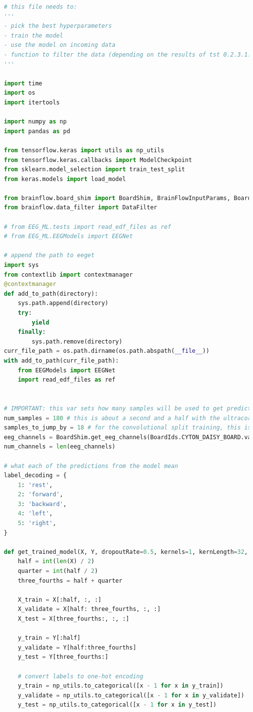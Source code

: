 \documentclass[conference]{IEEEtran}
\begin{document}
    \begin{lstlisting}[language=Python, caption=Machine Learning Calls, label=ml_calls]
# this file needs to:
'''
- pick the best hyperparameters
- train the model
- use the model on incoming data
- function to filter the data (depending on the results of tst 0.2.3.1.3 and 0.2.3.1.4)
'''

import time
import os
import itertools

import numpy as np
import pandas as pd

from tensorflow.keras import utils as np_utils
from tensorflow.keras.callbacks import ModelCheckpoint
from sklearn.model_selection import train_test_split
from keras.models import load_model

from brainflow.board_shim import BoardShim, BrainFlowInputParams, BoardIds
from brainflow.data_filter import DataFilter

# from EEG_ML.tests import read_edf_files as ref
# from EEG_ML.EEGModels import EEGNet

# append the path to eeget
import sys
from contextlib import contextmanager
@contextmanager
def add_to_path(directory):
    sys.path.append(directory)
    try:
        yield
    finally:
        sys.path.remove(directory)
curr_file_path = os.path.dirname(os.path.abspath(__file__))
with add_to_path(curr_file_path):
    from EEGModels import EEGNet
    import read_edf_files as ref


# IMPORTANT: this var sets how many samples will be used to get predictions
num_samples = 180 # this is about a second and a half with the ultracortex mark iv
samples_to_jump_by = 18 # for the convolutional split training, this is the number of samples 
eeg_channels = BoardShim.get_eeg_channels(BoardIds.CYTON_DAISY_BOARD.value)
num_channels = len(eeg_channels)

# what each of the predictions from the model mean
label_decoding = {
    1: 'rest',
    2: 'forward',
    3: 'backward',
    4: 'left',
    5: 'right',
}

def get_trained_model(X, Y, dropoutRate=0.5, kernels=1, kernLength=32, F1=8, D=2, F2=16, batch_size=16):
    half = int(len(X) / 2)
    quarter = int(half / 2)
    three_fourths = half + quarter

    X_train = X[:half, :, :]
    X_validate = X[half: three_fourths, :, :]
    X_test = X[three_fourths:, :, :]

    y_train = Y[:half]
    y_validate = Y[half:three_fourths]
    y_test = Y[three_fourths:]

    # convert labels to one-hot encoding
    y_train = np_utils.to_categorical([x - 1 for x in y_train])
    y_validate = np_utils.to_categorical([x - 1 for x in y_validate])
    y_test = np_utils.to_categorical([x - 1 for x in y_test])


\end{lstlisting}
\end{document}
